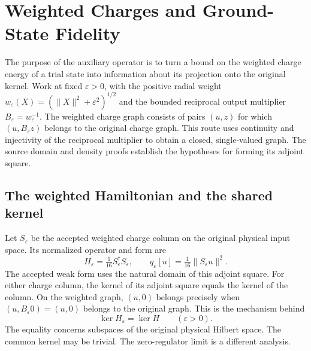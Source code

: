 \chapter{Weighted Charges and Ground-State Fidelity}
\label{ch:weighted-fidelity}
The purpose of the auxiliary operator is to turn a bound on the
weighted charge energy of a trial state into information about its
projection onto the original kernel. Work at fixed $\varepsilon>0$,
with the positive radial weight
$w_\varepsilon(X)=(\|X\|^2+\varepsilon^2)^{1/2}$ and the bounded
reciprocal output multiplier $B_\varepsilon=w_\varepsilon^{-1}$.
The weighted charge graph consists of pairs $(u,z)$ for which
$(u,B_\varepsilon z)$ belongs to the original charge graph. This route
uses continuity and injectivity of the reciprocal multiplier to obtain
a closed, single-valued graph. The source domain and density proofs
establish the hypotheses for forming its adjoint square.

\section{The weighted Hamiltonian and the shared kernel}
Let $S_\varepsilon$ be the accepted weighted charge column on the
original physical input space. Its normalized operator and form are
\[
 H_\varepsilon=\tfrac1{16}S_\varepsilon^\dagger S_\varepsilon,
 \qquad q_\varepsilon[u]=\tfrac1{16}\|S_\varepsilon u\|^2 .
\]
The accepted weak form uses the natural domain of this adjoint square.
For either charge column, the kernel of its adjoint square equals
the kernel of the column. On the weighted graph, $(u,0)$ belongs
precisely when $(u,B_\varepsilon 0)=(u,0)$ belongs to the original
graph. This is the mechanism behind
\begin{equation}\label{eq:ed08-kernels}
 \ker H_\varepsilon=\ker H\qquad(\varepsilon>0).
\end{equation}
The equality concerns subspaces of the original physical Hilbert
space. The common kernel may be trivial. The zero-regulator limit is
a different analysis.

